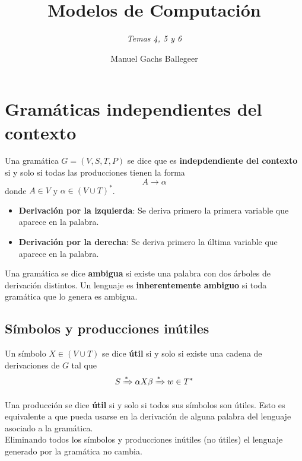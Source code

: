 \documentclass[11pt,titlepage,a4paper]{article}
\theoremstyle{ejemplo}
\theoremstyle{algoritmo}
\begin{document}
\title{\Huge{\textbf{Modelos de Computación}}}
\author{\textit{Temas 4, 5 y 6}}
\date{Manuel Gachs Ballegeer}
\maketitle

\section{Gramáticas independientes del contexto}

Una gramática $G=(V,S,T,P)$ se dice que es \textbf{indepdendiente del contexto}
si y solo si todas las producciones tienen la forma
$$A\to\alpha$$
donde $A\in V$ y $\alpha\in(V\cup T)^*$.
\begin{itemize}[noitemsep]
	\item \textbf{Derivación por la izquierda}: Se deriva primero la primera 
	variable que aparece en la palabra.
	\item \textbf{Derivación por la derecha}: Se deriva primero la última 
	variable que aparece en la palabra.
\end{itemize}

Una gramática se dice \textbf{ambigua} si existe una palabra con dos árboles de 
derivación distintos. Un lenguaje es \textbf{inherentemente ambiguo} si toda 
gramática que lo genera es ambigua.

\subsection{Símbolos y producciones inútiles}

Un símbolo $X\in(V\cup T)$ se dice \textbf{útil} si y solo si existe una cadena
de derivaciones de $G$ tal que
$$S\xRightarrow{*}\alpha X\beta\xRightarrow{*}w\in T^*$$

Una producción se dice \textbf{útil} si y solo si todos sus símbolos son
útiles. Esto es equivalente a que pueda usarse en la derivación de alguna 
palabra del lenguaje asociado a la gramática.
\\

Eliminando todos los símbolos y producciones inútiles (no útiles) el 
lenguaje generado por la gramática no cambia.
\end{document}
